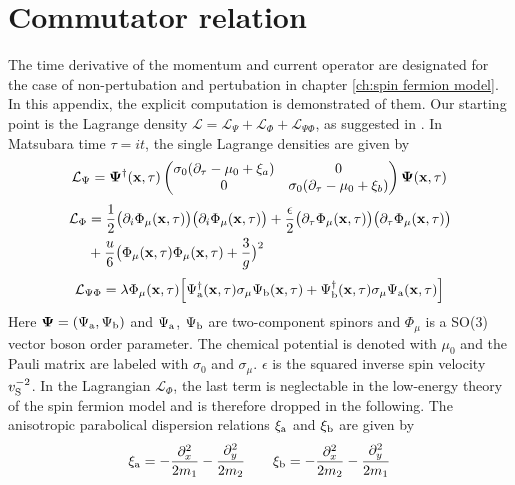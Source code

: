 %
%
%
\chapter{Commutator relation}
\label{appch:commutator}
%
%
%
The time derivative of the momentum and current operator are designated for the case of non-pertubation and pertubation in chapter \ref{ch:spin fermion model}.
In this appendix, the explicit computation is demonstrated of them.
Our starting point is the Lagrange density $\mathcal{L} = \mathcal{L}_{\Psi} + \mathcal{L}_{\Phi} + \mathcal{L}_{\Psi\Phi}$, as suggested in \cite{Patel&Sachdev}.
In Matsubara time $\tau = it$, the single Lagrange densities are given by
%
\begin{align}
	\mathcal{L}_{\Psi} = 
		\vb{\Psi}^{\dag}(\vb{x},\tau) 
		\begin{pmatrix}\sigma_{0} (\partial_{\tau}-\mu_{0}+\xi_{a}) & 0\\0 & \sigma_{0} (\partial_{\tau}-\mu_{0}+\xi_{b})\end{pmatrix}
		\vb{\Psi}(\vb{x},\tau)
\end{align}
%
\begin{align}
	\mathcal{L}_{\Phi} &= 
		\frac{1}{2} \big(\partial_{i}\Phi_{\mu}(\vb{x},\tau)\big) \big(\partial_{i}\Phi_{\mu}(\vb{x},\tau)\big) 
		+ 
		\frac{\epsilon}{2} \big(\partial_{\tau}\Phi_{\mu}(\vb{x},\tau)\big) \big(\partial_{\tau}\Phi_{\mu}(\vb{x},\tau)\big) 
		\notag \\&+
		\frac{u}{6} \big(\Phi_{\mu}(\vb{x},\tau) \Phi_{\mu}(\vb{x},\tau) + \frac{3}{g}\big)^{2}
\end{align}
\begin{align}
	\mathcal{L}_{\Psi\Phi} =
		\lambda\Phi_{\mu}(\vb{x},\tau) \Big[\Psi_{\mathrm{a}}^{\dag}(\vb{x},\tau) \sigma_{\mu} \Psi_{\mathrm{b}}(\vb{x},\tau) + \Psi_{\mathrm{b}}^{\dag}(\vb{x},\tau) \sigma_{\mu} \Psi_{\mathrm{a}}(\vb{x},\tau)\Big]
\end{align}
Here $\vb{\Psi} = (\Psi_{\mathrm{a}}, \Psi_{\mathrm{b}})$ and $\Psi_{\mathrm{a}}$, $\Psi_{\mathrm{b}}$ are two-component spinors and $\Phi_{\mu}$ is a SO(3) vector boson order parameter.
The chemical potential is denoted with $\mu_0$ and the Pauli matrix are labeled with $\sigma_{0}$ and $\sigma_{\mu}$.
$\epsilon$ is the squared inverse spin velocity $v_{\mathrm{S}}^{-2}$.
In the Lagrangian $\mathcal{L}_{\Phi}$, the last term is neglectable in the low-energy theory of the spin fermion model and is therefore dropped in the following.
The anisotropic parabolical dispersion relations $\xi_{\mathrm{a}}$ and $\xi_{\mathrm{b}}$ are given by 
%
\begin{align}
	\xi_{\mathrm{a}} = - \frac{\partial_{x}^{2}}{2m_{1}} - \frac{\partial_{y}^{2}}{2m_{2}} \qquad \xi_{\mathrm{b}} = - \frac{\partial_{x}^{2}}{2m_{2}} - \frac{\partial_{y}^{2}}{2m_{1}}
\end{align}
